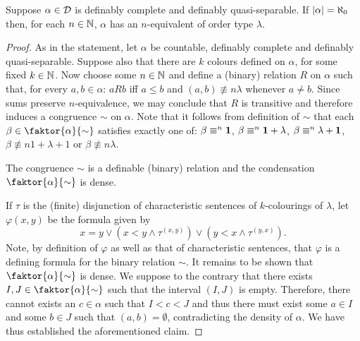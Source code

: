 \begin{thm}
	Suppose $\alpha\in\mathcal{D}$ is definably complete and definably quasi-separable. If $\left\lvert\alpha\right\rvert=\aleph_0$ then, for each $n\in\mathbb{N}$, $\alpha$ has an $n$-equivalent of order type $\lambda$.
\end{thm}
\begin{proof}

	As in the statement, let $\alpha$ be countable, definably complete and definably quasi-separable.  Suppose also that there are $k$ colours defined on $\alpha$, for some fixed $k\in\mathbb{N}$.  Now choose some $n\in\mathbb{N}$ and define a (binary) relation $R$ on $\alpha$ such that, for every $a,b\in\alpha$:  $aRb$ iff $a\leq b$ and $(a,b)\nequiv{n}\lambda$ whenever $a\neq b$.  Since sums preserve $n$-equivalence, we may conclude that $R$ is transitive and therefore induces a congruence $\sim$ on $\alpha$.  Note that it follows from definition of $\sim$ that each $\beta\in\faktor{\alpha}{\sim}$ satisfies exactly one of: $\beta\equiv^{n}\mathbf{1}$, $\beta\equiv^{n}\mathbf{1}+\lambda$, $\beta\equiv^{n}\lambda+\mathbf{1}$, $\beta\nequiv{n}1+\lambda+1$ or $\beta\nequiv{n}\lambda$.

	\begin{claim}
		The congruence $\sim$ is a definable (binary) relation and the condensation $\faktor{\alpha}{\sim}$ is dense.
	\end{claim}
	If $\tau$ is the (finite) disjunction of characteristic sentences of $k$-colourings of $\lambda$, let $\varphi(x,y)$ be the formula given by
	\begin{equation}\label{eq:condef}
		x=y\vee(x<y\wedge\tau^{(x,y)})\vee(y<x\wedge\tau^{(y,x)}).
	\end{equation}
	Note, by definition of $\varphi$ as well as that of characteristic sentences, that $\varphi$ is a defining formula for the binary relation $\sim$.  It remains to be shown that $\faktor{\alpha}{\sim}$ is dense.  We suppose to the contrary that there exists $I,J\in\faktor{\alpha}{\sim}$ such that the interval $(I,J)$ is empty.  Therefore, there cannot exists an $c\in\alpha$ such that $I<c<J$ and thus there must exist some $a\in I$ and some $b\in J$ such that $(a,b)=\emptyset$, contradicting the density of $\alpha$.  We have thus established the aforementioned claim.


\end{proof}
